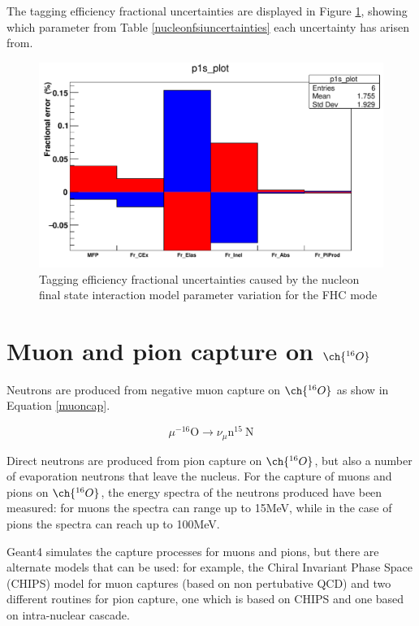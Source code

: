 The tagging efficiency fractional uncertainties are displayed in Figure \ref{fig:nucleonfsiuncertainty}, showing which parameter from Table \ref{nucleonfsiuncertainties} each uncertainty has arisen from.

\begin{figure}[h!]
    \includegraphics[scale=0.4]{Figures/nucleonfsi_uncertainty.png}
\caption{Tagging efficiency fractional uncertainties caused by the nucleon final state interaction model parameter variation for the FHC mode}
\label{fig:nucleonfsiuncertainty}
\end{figure}

\section{Muon and pion capture on $\ch{^{16}O}$}

Neutrons are produced from negative muon capture on $\ch{^{16}O}$ as show in Equation \ref{muoncap}.

\begin{equation}
    \mu^{-16} \mathrm{O} \longrightarrow \nu_{\mu} \mathrm{n}^{15} \mathrm{~N}
\label{muoncap}
\end{equation}

Direct neutrons are produced from pion capture on $\ch{^{16}O}$, but also a number of evaporation neutrons that leave the nucleus. For the capture of muons and pions on $\ch{^{16}O}$, the energy spectra of the neutrons produced have been measured: for muons the spectra can range up to 15MeV, while in the case of pions the spectra can reach up to 100MeV.


Geant4 simulates the capture processes for muons and pions, but there are alternate models that can be used: for example, the Chiral Invariant Phase Space (CHIPS) model for muon captures (based on non pertubative QCD) and two different routines for pion capture, one which is based on CHIPS and one based on intra-nuclear cascade.

